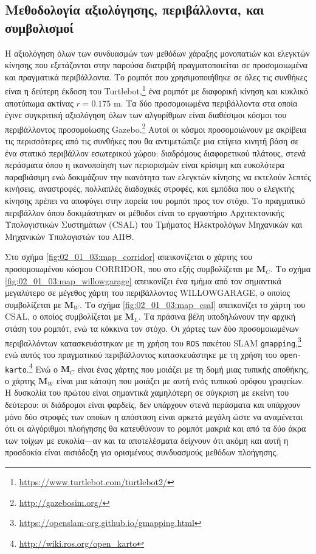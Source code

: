 \subsection{Μεθοδολογία αξιολόγησης, περιβάλλοντα, και συμβολισμοί}
\label{subsection:02_01_03:01}

Η αξιολόγηση όλων των συνδυασμών των μεθόδων χάραξης μονοπατιών και ελεγκτών
κίνησης που εξετάζονται στην παρούσα διατριβή πραγματοποιείται σε προσομοιωμένα
και πραγματικά περιβάλλοντα. Το ρομπότ που χρησιμοποιήθηκε σε όλες τις συνθήκες
είναι η δεύτερη έκδοση του
Turtlebot,\footnote{\url{https://www.turtlebot.com/turtlebot2/}} ένα ρομπότ με
διαφορική κίνηση και κυκλικό αποτύπωμα ακτίνας $r=0.175$ m. Τα δύο
προσομοιωμένα περιβάλλοντα στα οποία έγινε συγκριτική αξιολόγηση όλων των
αλγορίθμων είναι διαθέσιμοι κόσμοι του περιβάλλοντος προσομοίωσης
Gazebo.\footnote{\url{http://gazebosim.org/}} Αυτοί οι κόσμοι προσομοιώνουν με
ακρίβεια τις περισσότερες από τις συνθήκες που θα αντιμετώπιζε μια επίγεια
κινητή βάση σε ένα στατικό περιβάλλον εσωτερικού χώρου: διαδρόμους διαφορετικού
πλάτους, στενά περάσματα όπου η ικανοποίηση των περιορισμών είναι κρίσιμη και
ευκολότερα παραβιάσιμη ενώ δοκιμάζουν την ικανότητα των ελεγκτών κίνησης να
εκτελούν λεπτές κινήσεις, αναστροφές, πολλαπλές διαδοχικές στροφές, και εμπόδια
που ο ελεγκτής κίνησης πρέπει να αποφύγει στην πορεία του ρομπότ προς
τον στόχο. Το πραγματικό περιβάλλον όπου δοκιμάστηκαν οι μέθοδοι είναι το
εργαστήριο Αρχιτεκτονικής Υπολογιστικών Συστημάτων (CSAL) του Τμήματος
Ηλεκτρολόγων Μηχανικών και Μηχανικών Υπολογιστών του ΑΠΘ.

Στο σχήμα \ref{fig:02_01_03:map_corridor} απεικονίζεται ο χάρτης του
προσομοιωμένου κόσμου CORRIDOR, που στο εξής συμβολίζεται με $\bm{M}_C$. Το
σχήμα \ref{fig:02_01_03:map_willowgarage} απεικονίζει ένα τμήμα από τον
σημαντικά μεγαλύτερο σε μέγεθος χάρτη του περιβάλλοντος WILLOWGARAGE, ο οποίος
συμβολίζεται με $\bm{M}_W$. Το σχήμα \ref{fig:02_01_03:map_csal} απεικονίζει το
χάρτη του CSAL, ο οποίος συμβολίζεται με $\bm{M}_L$.  Τα πράσινα βέλη
υποδηλώνουν την αρχική στάση του ρομπότ, ενώ τα κόκκινα τον στόχο. Οι χάρτες
των δύο προσομοιωμένων περιβαλλόντων κατασκευάστηκαν με τη χρήση του
\texttt{ROS} πακέτου SLAM
\texttt{gmapping},\footnote{\url{https://openslam-org.github.io/gmapping.html}}
ενώ αυτός του πραγματικού περιβάλλοντος κατασκευάστηκε με τη χρήση του
\texttt{open-karto}.\footnote{\url{http://wiki.ros.org/open\_karto}} Ενώ ο
$\bm{M}_C$ είναι ένας χάρτης που μοιάζει με τη δομή μιας τυπικής αποθήκης, ο
χάρτης $\bm{M}_W$ είναι μια κάτοψη που μοιάζει με αυτή ενός τυπικού ορόφου
γραφείων. Η δυσκολία του πρώτου είναι σημαντικά χαμηλότερη σε σύγκριση με
εκείνη του δεύτερου: οι διάδρομοι είναι φαρδείς, δεν υπάρχουν στενά περάσματα
και υπάρχουν μόνο δύο στροφές των οποίων η απόσταση είναι αρκετά μεγάλη ώστε να
αναμένεται ότι οι αλγόριθμοι πλοήγησης θα κατευθύνουν το ρομπότ μακριά και από
τα δύο άκρα των τοίχων με ευκολία---αν και τα αποτελέσματα δείχνουν ότι ακόμη
και αυτή η προσδοκία είναι αισιόδοξη για ορισμένους συνδυασμούς μεθόδων
πλοήγησης.

